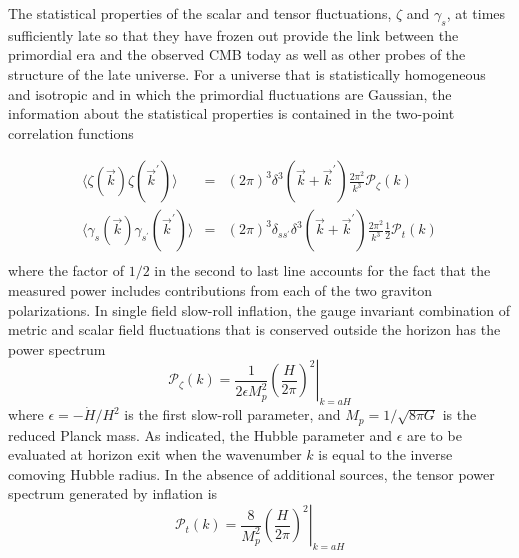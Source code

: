 The statistical properties of the scalar and tensor fluctuations, $\zeta$ and $\gamma_s$, at times sufficiently late so that they have frozen out provide the link between the primordial era and the observed CMB today as well as other probes of the structure of the late universe. For a universe that is statistically homogeneous and isotropic and in which the primordial fluctuations are Gaussian, the information about the statistical properties is contained in the two-point correlation functions

\begin{eqnarray}
\langle\zeta(\vec{k})\zeta(\vec{k}^{\prime})\rangle&=&(2\pi)^3\delta^3(\vec{k}+\vec{k}^{\prime})\frac{2\pi^2}{k^3}\mathcal{P}_{\zeta}(k)\nonumber\\
\langle\gamma_s(\vec{k})\gamma_{s^{\prime}}(\vec{k}^{\prime})\rangle&=&(2\pi)^3\delta_{ss^{\prime}}\delta^3(\vec{k}+\vec{k}^{\prime})\frac{2\pi^2}{k^3}\frac{1}{2}\mathcal{P}_{t}(k)\nonumber\\
\end{eqnarray}
where the factor of $1/2$ in the second to last line accounts for the fact that the measured power includes contributions from each of the two graviton polarizations. In single field slow-roll inflation, the gauge invariant combination of metric and scalar field fluctuations that is conserved outside the horizon has the power spectrum
\begin{equation}
\label{eq:inf_Pzeta}
\mathcal{P}_{\zeta}(k)=\frac{1}{2\epsilon M_p^2}\left.\left(\frac{H}{2\pi}\right)^2\right|_{k=aH}
\end{equation}
where $\epsilon=-\dot{H}/H^2$ is the first slow-roll parameter, and $M_p=1/\sqrt{8\pi G}$ is the reduced Planck mass. As indicated, the Hubble parameter and $\epsilon$ are to be evaluated at horizon exit when the wavenumber $k$ is equal to the inverse comoving Hubble radius. In the absence of additional sources, the tensor power spectrum generated by inflation is
\begin{equation}
\label{eq:inf_Pt}
\mathcal{P}_{t}(k)=\frac{8}{M_p^2}\left.\left(\frac{H}{2\pi}\right)^2\right|_{k=aH}
\end{equation}

